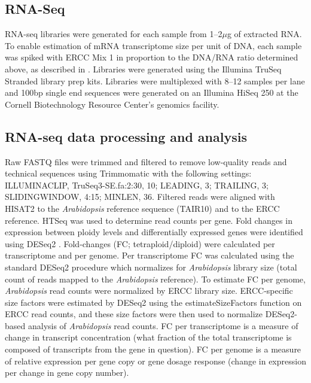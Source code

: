 \documentclass[11pt]{article}
\begin{document}
\subsection*{RNA-Seq}
RNA-seq libraries were generated for each sample from 1--2$\mu$g of extracted RNA.
To enable estimation of mRNA transcriptome size per unit of DNA, each sample was spiked with ERCC Mix 1 in proportion to the DNA/RNA ratio determined above, as described in \cite{robinson2018}.
Libraries were generated using the Illumina TruSeq Stranded library prep kits.
Libraries were multiplexed with 8--12 samples per lane and 100bp single end sequences were generated on an Illumina HiSeq 250 at the Cornell Biotechnology Resource Center's genomics facility.\\

\subsection*{RNA-seq data processing and analysis}
Raw FASTQ files were trimmed and filtered to remove low-quality reads and technical sequences using Trimmomatic \citep{bolger2014} with the following settings: ILLUMINACLIP, TruSeq3-SE.fa:2:30, 10; LEADING, 3; TRAILING, 3; SLIDINGWINDOW, 4:15; MINLEN, 36.
Filtered reads were aligned with HISAT2 \citep{pertea2016} to the \textit{Arabidopsis} reference sequence (TAIR10) and to the ERCC reference.
HTSeq \citep{anders2015} was used to determine read counts per gene.
Fold changes in expression between ploidy levels and differentially expressed genes were identified using DESeq2 \citep{love2014}.
Fold-changes (FC; tetraploid/diploid) were calculated per transcriptome and per genome.
Per transcriptome FC was calculated using the standard DESeq2 procedure which normalizes for \textit{Arabidopsis} library size (total count of reads mapped to the \textit{Arabidopsis} reference).
To estimate FC per genome, \textit{Arabidopsis} read counts were normalized by ERCC library size.
ERCC-specific size factors were estimated by DESeq2 using the estimateSizeFactors function on ERCC read counts, and these size factors were then used to normalize DESeq2-based analysis of \textit{Arabidopsis} read counts.
FC per transcriptome is a measure of change in transcript concentration (what fraction of the total transcriptome is composed of transcripts from the gene in question).
FC per genome is a measure of relative expression per gene copy or gene dosage response (change in expression per change in gene copy number).\\
\end{document}

